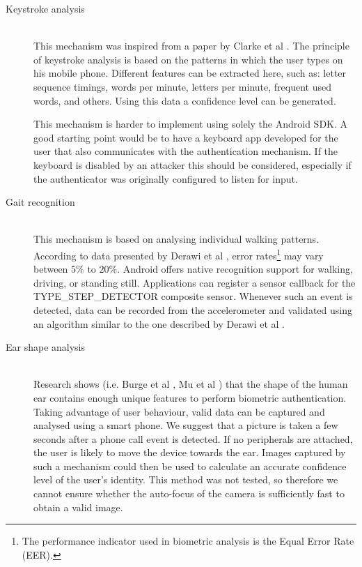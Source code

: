 \begin{description}
  \item[Keystroke analysis] \hfill \\
  This mechanism was inspired from a paper by Clarke et al \cite{clarke2007authenticating}. The principle of keystroke analysis is based on the patterns in which the user types on his mobile phone. Different features can be extracted here, such as: letter sequence timings, words per minute, letters per minute, frequent used words, and others. Using this data a confidence level can be generated. 
  
  This mechanism is harder to implement using solely the Android SDK. A good starting point would be to have a keyboard app developed for the user that also communicates with the authentication mechanism. If the keyboard is disabled by an attacker this should be considered, especially if the authenticator was originally configured to listen for input.
  
  \item[Gait recognition] \hfill \\
  This mechanism is based on analysing individual walking patterns. According to data presented by Derawi et al \cite{derawi2010unobtrusive}, error rates\footnote{The performance indicator used in biometric analysis is the Equal Error Rate (EER).} may vary between $5\%$ to $20\%$.  Android offers native recognition support for walking, driving, or standing still. Applications can register a sensor callback for the TYPE\_STEP\_DETECTOR composite sensor. Whenever such an event is detected, data can be recorded from the accelerometer and validated using an algorithm similar to the one described by Derawi et al \cite{derawi2010unobtrusive}.
  
  \item[Ear shape analysis] \hfill \\
  Research shows (i.e. Burge et al \cite{burge1996ear}, Mu et al \cite{mu2005shape}) that the shape of the human ear contains enough unique features to perform biometric authentication. Taking advantage of user behaviour, valid data can be captured and analysed using a smart phone. We suggest that a picture is taken a few seconds after a phone call event is detected. If no peripherals are attached, the user is likely to move the device towards the ear. Images captured by such a mechanism could then be used to calculate an accurate confidence level of the user's identity. This method was not tested, so therefore we cannot ensure whether the auto-focus of the camera is sufficiently fast to obtain a valid image.
  

\end{description}
